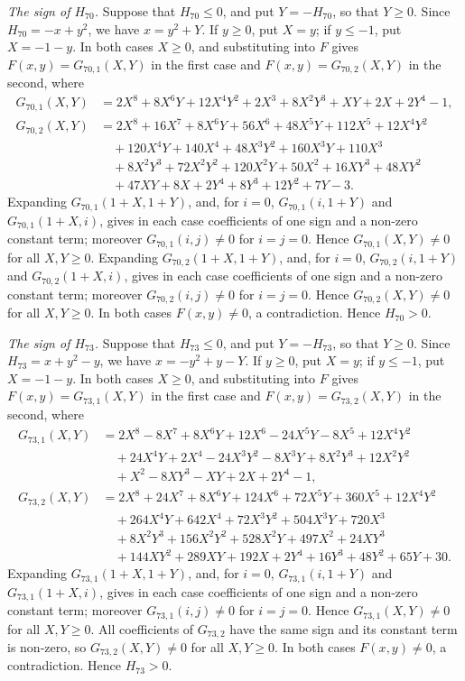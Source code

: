 \documentclass[11pt]{article}
\begin{document}
\emph{The sign of $H_{70}$.} Suppose that $H_{70}\leq0$, and put $Y=-H_{70}$, so that $Y\geq0$. Since $H_{70}=-x+y^{2}$, we have $x=y^{2}+Y$. If $y\geq0$, put $X=y$; if $y\leq-1$, put $X=-1-y$. In both cases $X\geq0$, and substituting into $F$ gives $F(x,y)=G_{70,1}(X,Y)$ in the first case and $F(x,y)=G_{70,2}(X,Y)$ in the second, where
\begin{align*}
G_{70,1}(X,Y)&=2X^{8}+8X^{6}Y+12X^{4}Y^{2}+2X^{3}+8X^{2}Y^{3}+XY+2X+2Y^{4}-1,\\
G_{70,2}(X,Y)&=2X^{8}+16X^{7}+8X^{6}Y+56X^{6}+48X^{5}Y+112X^{5}+12X^{4}Y^{2}\\
&\quad+120X^{4}Y+140X^{4}+48X^{3}Y^{2}+160X^{3}Y+110X^{3}\\
&\quad+8X^{2}Y^{3}+72X^{2}Y^{2}+120X^{2}Y+50X^{2}+16XY^{3}+48XY^{2}\\
&\quad+47XY+8X+2Y^{4}+8Y^{3}+12Y^{2}+7Y-3.
\end{align*}
Expanding $G_{70,1}(1+X,1+Y)$, and, for $i=0$, $G_{70,1}(i,1+Y)$ and $G_{70,1}(1+X,i)$, gives in each case coefficients of one sign and a non-zero constant term; moreover $G_{70,1}(i,j)\neq0$ for $i=j=0$. Hence $G_{70,1}(X,Y)\neq0$ for all $X,Y\geq0$. Expanding $G_{70,2}(1+X,1+Y)$, and, for $i=0$, $G_{70,2}(i,1+Y)$ and $G_{70,2}(1+X,i)$, gives in each case coefficients of one sign and a non-zero constant term; moreover $G_{70,2}(i,j)\neq0$ for $i=j=0$. Hence $G_{70,2}(X,Y)\neq0$ for all $X,Y\geq0$. In both cases $F(x,y)\neq0$, a contradiction. Hence $H_{70}>0$.

\emph{The sign of $H_{73}$.} Suppose that $H_{73}\leq0$, and put $Y=-H_{73}$, so that $Y\geq0$. Since $H_{73}=x+y^{2}-y$, we have $x=-y^{2}+y-Y$. If $y\geq0$, put $X=y$; if $y\leq-1$, put $X=-1-y$. In both cases $X\geq0$, and substituting into $F$ gives $F(x,y)=G_{73,1}(X,Y)$ in the first case and $F(x,y)=G_{73,2}(X,Y)$ in the second, where
\begin{align*}
G_{73,1}(X,Y)&=2X^{8}-8X^{7}+8X^{6}Y+12X^{6}-24X^{5}Y-8X^{5}+12X^{4}Y^{2}\\
&\quad+24X^{4}Y+2X^{4}-24X^{3}Y^{2}-8X^{3}Y+8X^{2}Y^{3}+12X^{2}Y^{2}\\
&\quad+X^{2}-8XY^{3}-XY+2X+2Y^{4}-1,\\
G_{73,2}(X,Y)&=2X^{8}+24X^{7}+8X^{6}Y+124X^{6}+72X^{5}Y+360X^{5}+12X^{4}Y^{2}\\
&\quad+264X^{4}Y+642X^{4}+72X^{3}Y^{2}+504X^{3}Y+720X^{3}\\
&\quad+8X^{2}Y^{3}+156X^{2}Y^{2}+528X^{2}Y+497X^{2}+24XY^{3}\\
&\quad+144XY^{2}+289XY+192X+2Y^{4}+16Y^{3}+48Y^{2}+65Y+30.
\end{align*}
Expanding $G_{73,1}(1+X,1+Y)$, and, for $i=0$, $G_{73,1}(i,1+Y)$ and $G_{73,1}(1+X,i)$, gives in each case coefficients of one sign and a non-zero constant term; moreover $G_{73,1}(i,j)\neq0$ for $i=j=0$. Hence $G_{73,1}(X,Y)\neq0$ for all $X,Y\geq0$. All coefficients of $G_{73,2}$ have the same sign and its constant term is non-zero, so $G_{73,2}(X,Y)\neq0$ for all $X,Y\geq0$. In both cases $F(x,y)\neq0$, a contradiction. Hence $H_{73}>0$.
\end{document}
